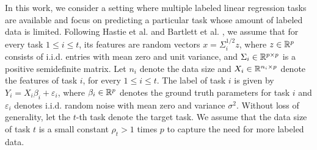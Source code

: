 

In this work, we consider a setting where multiple labeled linear regression tasks are available and focus on predicting a particular task whose amount of labeled data is limited.
Following Hastie et al. \cite{HMRT19} and Bartlett et al. \cite{BLLT20}, we assume that for every task $1\le i\le t$, its features are random vectors $x = \Sigma_i^{1/2}z$, where $z\in\mathbb{R}^p$ consists of i.i.d. entries with mean zero and unit variance, and $\Sigma_i\in\mathbb{R}^{p\times p}$ is a positive semidefinite matrix.
Let $n_i$ denote the data size and $X_i\in\mathbb{R}^{n_i\times p}$ denote the features of task $i$, for every $1\le i\le t$.
The label of task $i$ is given by $Y_i = X_i\beta_i + \varepsilon_i$, where $\beta_i\in\mathbb{R}^p$ denotes the ground truth parameters for task $i$ and $\varepsilon_i$ denotes i.i.d. random noise with mean zero and variance $\sigma^2$.
Without loss of generality, let the $t$-th task denote the target task.
We assume that the data size of task $t$ is a small constant $\rho_t > 1$ times $p$ to capture the need for more labeled data.

